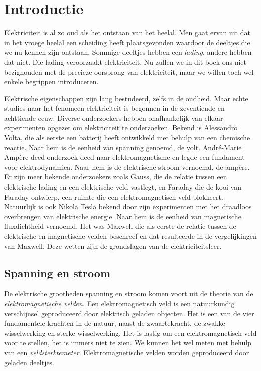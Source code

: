 \chapter{Introductie}
\label{cha:introductie}

Elektriciteit is al zo oud als het ontstaan van het heelal. Men gaat ervan uit dat in het vroege heelal een scheiding heeft plaatsgevonden waardoor de deeltjes die we nu kennen zijn ontstaan. Sommige deeltjes hebben een \textsl{lading}, andere hebben dat niet. Die lading veroorzaakt elektriciteit. Nu zullen we in dit boek ons niet bezighouden met de precieze oorsprong van elektriciteit, maar we willen toch wel enkele begrippen introduceren.

Elektrische eigenschappen zijn lang bestudeerd, zelfs in de oudheid. Maar echte studies naar het fenomeen elektriciteit is begonnen in de zeventiende en achttiende eeuw. Diverse onderzoekers hebben onafhankelijk van elkaar experimenten opgezet om elektriciteit te onderzoeken. Bekend is Alessandro Volta, die als eerste een batterij heeft ontwikkeld met behulp van een chemische reactie. Naar hem is de eenheid van spanning genoemd, de volt. André-Marie Ampère deed onderzoek deed naar elektromagnetisme en legde een fundament voor elektrodynamica. Naar hem is de elektrische stroom vernoemd, de ampère. Er zijn meer bekende onderzoekers zoals Gauss, die de relatie tussen een elektrische lading en een elektrische veld vastlegt, en Faraday die de kooi van Faraday ontwierp, een ruimte die een elektromagnetisch veld blokkeert. Natuurlijk is ook Nikola Tesla bekend door zijn experimenten met het draadloos overbrengen van elektrische energie. Naar hem is de eenheid van magnetische fluxdichtheid vernoemd. Het was Maxwell die als eerste de relatie tussen de elektrische en magnetische velden beschreef en dat resulteerde in de vergelijkingen van Maxwell. Deze wetten zijn de grondslagen van de elektriciteitsleer.


\section{Spanning en stroom}
De elektrische grootheden spanning en stroom komen voort uit de theorie van de \textsl{elektromagnetische velden}. Een elektromagnetisch veld is een natuurkundig verschijnsel geproduceerd door elektrisch geladen objecten. Het is een van de vier fundamentele krachten in de natuur, naast de zwaartekracht, de zwakke wisselwerking en sterke wisselwerking. Het is lastig om een elektromagnetisch veld voor te stellen, het is immers niet te zien. We kunnen het wel meten met behulp van een \textsl{veldsterktemeter}. Elektromagnetische velden worden geproduceerd door geladen deeltjes.

